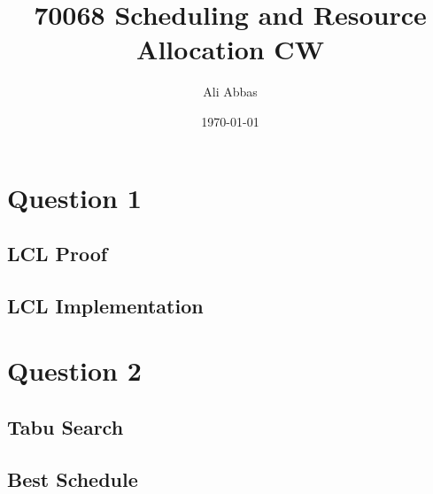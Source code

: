 \documentclass[fleqn]{article}
\date{\today}
\author{Ali Abbas}
\title{70068 Scheduling and Resource Allocation CW}
\begin{document}
  \maketitle
  \section{Question 1}
  \subsection{LCL Proof}

  \subsection{LCL Implementation}

  \section{Question 2}
  \subsection{Tabu Search}

  \subsection{Best Schedule}
\end{document}

